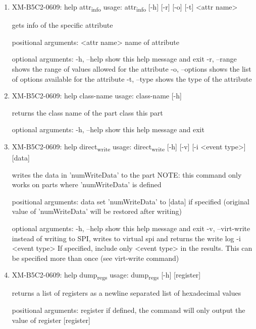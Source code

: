 \documentclass[11pt]{article}
\begin{document}
\begin{enumerate}
\item XM-B5C2-0609: help attr\textsubscript{info}
\label{sec:org9d453e4}
usage: attr\textsubscript{info} [-h] [-r] [-o] [-t] <attr name>

gets info of the specific attribute

positional arguments:
  <attr name>    name of attribute

optional arguments:
  -h, --help     show this help message and exit
  -r, --range    shows the range of values allowed for the attribute
  -o, --options  shows the list of options available for the attribute
  -t, --type     shows the type of the attribute

\item XM-B5C2-0609: help class-name
\label{sec:org0d1b1f4}
usage: class-name [-h]

returns the class name of the part class this part

optional arguments:
  -h, --help  show this help message and exit

\item XM-B5C2-0609: help direct\textsubscript{write}
\label{sec:orgbf193b3}
usage: direct\textsubscript{write} [-h] [-v] [-i <event type>] [data]

writes the data in 'numWriteData' to the part NOTE: this command only works on
parts where 'numWriteData' is defined

positional arguments:
  data              set 'numWriteData' to [data] if specified (original value
                    of 'numWriteData' will be restored after writing)

optional arguments:
  -h, --help        show this help message and exit
  -v, --virt-write  instead of writing to SPI, writes to virtual spi and
                    returns the write log
  -i <event type>   If specified, include only <event type> in the results.
                    This can be specified more than once (see virt-write
                    command)

\item XM-B5C2-0609: help dump\textsubscript{regs}
\label{sec:orgac4bbed}
usage: dump\textsubscript{regs} [-h] [register]

returns a list of registers as a newline separated list of hexadecimal values

positional arguments:
  register    if defined, the command will only output the value of register
              [register]


\end{enumerate}
\end{document}
